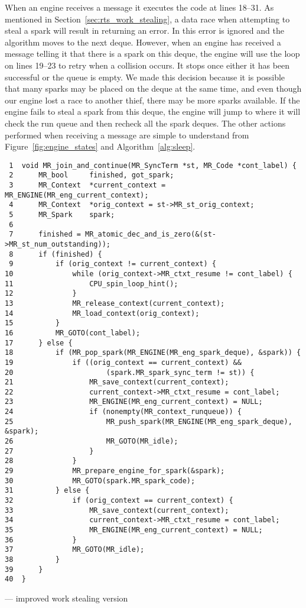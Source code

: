 When an engine receives a  message it executes
the code at lines 18--31.
As mentioned in Section~\ref{sec:rts_work_stealing},
a data race when attempting to steal a spark will result in
\steal returning an error.
In \trystealspark this error is ignored and the algorithm moves to the next
deque.
However,
when an engine has received a message telling it that there is a spark on
this deque, the engine will use the loop on lines 19--23 to retry when a
collision occurs.
It stops once either it has been successful or the queue is empty.
We made this decision because it is possible that many sparks may be placed
on the deque at the same time,
and even though our engine lost a race to another thief, there may be more
sparks available.
If the engine fails to steal a spark from this deque,
the engine will jump to \idle where it will check the run queue and then
recheck all the spark deques.
The other actions performed when receiving a message are simple to
understand from Figure~\ref{fig:engine_states} and
Algorithm~\ref{alg:sleep}.

\begin{algorithm}[tbp]
\begin{verbatim}
 1  void MR_join_and_continue(MR_SyncTerm *st, MR_Code *cont_label) {
 2      MR_bool     finished, got_spark;
 3      MR_Context  *current_context = MR_ENGINE(MR_eng_current_context);
 4      MR_Context  *orig_context = st->MR_st_orig_context;
 5      MR_Spark    spark;
 6
 7      finished = MR_atomic_dec_and_is_zero(&(st->MR_st_num_outstanding));
 8      if (finished) {
 9          if (orig_context != current_context) {
10              while (orig_context->MR_ctxt_resume != cont_label) {
11                  CPU_spin_loop_hint();
12              }
13              MR_release_context(current_context);
14              MR_load_context(orig_context);
15          }
16          MR_GOTO(cont_label);
17      } else {
18          if (MR_pop_spark(MR_ENGINE(MR_eng_spark_deque), &spark)) {
19              if ((orig_context == current_context) &&
20                      (spark.MR_spark_sync_term != st)) {
21                  MR_save_context(current_context);
22                  current_context->MR_ctxt_resume = cont_label;
23                  MR_ENGINE(MR_eng_current_context) = NULL;
24                  if (nonempty(MR_context_runqueue)) {
25                      MR_push_spark(MR_ENGINE(MR_eng_spark_deque), &spark);
26                      MR_GOTO(MR_idle);
27                  }
28              }
29              MR_prepare_engine_for_spark(&spark);
30              MR_GOTO(spark.MR_spark_code);
31          } else {
32              if (orig_context == current_context) {
33                  MR_save_context(current_context);
34                  current_context->MR_ctxt_resume = cont_label;
35                  MR_ENGINE(MR_eng_current_context) = NULL;
36              }
37              MR_GOTO(MR_idle);
38          }
39      }
40  }
\end{verbatim}
\caption{\joinandcontinue --- improved work stealing version}
\label{alg:join_and_continue_ws2}
\end{algorithm}

